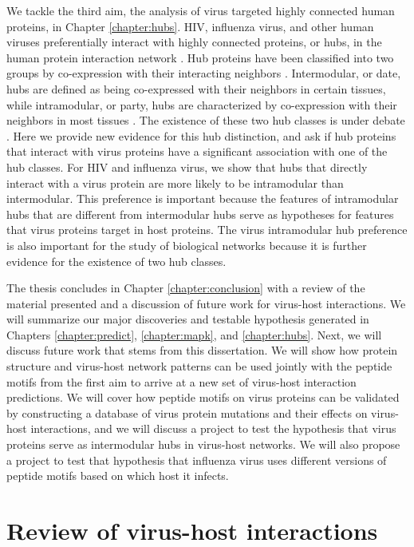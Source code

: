 We tackle the third aim, the analysis of virus targeted highly
connected human proteins, in Chapter \ref{chapter:hubs}. HIV,
influenza virus, and other human viruses preferentially interact with
highly connected proteins, or hubs, in the human protein interaction
network \cite{calderwood07, dyer08, dechassey08, tastan09}. Hub
proteins have been classified into two groups by co-expression with
their interacting neighbors \cite{taylor09}. Intermodular, or date,
hubs are defined as being co-expressed with their neighbors in certain
tissues, while intramodular, or party, hubs are characterized by
co-expression with their neighbors in most tissues
\cite{taylor09}. The existence of these two hub classes is under
debate \cite{taylor09,batada06,batada07,agarwal09,han04}. Here we
provide new evidence for this hub distinction, and ask if hub proteins
that interact with virus proteins have a significant association with
one of the hub classes. For HIV and influenza virus, we show that hubs
that directly interact with a virus protein are more likely to be
intramodular than intermodular. This preference is important because
the features of intramodular hubs that are different from intermodular
hubs serve as hypotheses for features that virus proteins target in
host proteins. The virus intramodular hub preference is also important
for the study of biological networks because it is further evidence
for the existence of two hub classes.

The thesis concludes in Chapter \ref{chapter:conclusion} with a review
of the material presented and a discussion of future work for
virus-host interactions. We will summarize our major discoveries and
testable hypothesis generated in Chapters \ref{chapter:predict},
\ref{chapter:mapk}, and \ref{chapter:hubs}. Next, we will discuss
future work that stems from this dissertation. We will show how
protein structure and virus-host network patterns can be used jointly
with the peptide motifs from the first aim to arrive at a new set of
virus-host interaction predictions. We will cover how peptide motifs
on virus proteins can be validated by constructing a database of virus
protein mutations and their effects on virus-host interactions, and we
will discuss a project to test the hypothesis that virus proteins
serve as intermodular hubs in virus-host networks. We will also
propose a project to test that hypothesis that influenza virus uses
different versions of peptide motifs based on which host it infects.

\section{Review of virus-host interactions}

